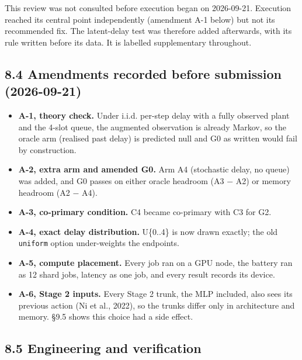 \documentclass[11pt]{article}
\begin{document}
This review was not consulted before execution began on 2026-09-21. Execution reached its central point independently (amendment A-1 below) but not its recommended fix. The latent-delay test was therefore added afterwards, with its rule written before its data. It is labelled supplementary throughout.



\subsection*{8.4 Amendments recorded before submission (2026-09-21)}



\begin{itemize}
\item \textbf{A-1, theory check.} Under i.i.d. per-step delay with a fully observed plant and the 4-slot queue, the augmented observation is already Markov, so the oracle arm (realised past delay) is predicted null and G0 as written would fail by construction.
\item \textbf{A-2, extra arm and amended G0.} Arm A4 (stochastic delay, no queue) was added, and G0 passes on either oracle headroom (A3 $-$ A2) or memory headroom (A2 $-$ A4).
\item \textbf{A-3, co-primary condition.} C4 became co-primary with C3 for G2.
\item \textbf{A-4, exact delay distribution.} U\{0..4\} is now drawn exactly; the old \texttt{uniform} option under-weights the endpoints.
\item \textbf{A-5, compute placement.} Every job ran on a GPU node, the battery ran as 12 shard jobs, latency as one job, and every result records its device.
\item \textbf{A-6, Stage 2 inputs.} Every Stage 2 trunk, the MLP included, also sees its previous action (Ni et al., 2022), so the trunks differ only in architecture and memory. \S{}9.5 shows this choice had a side effect.
\end{itemize}



\medskip



\subsection*{8.5 Engineering and verification}
\end{document}
